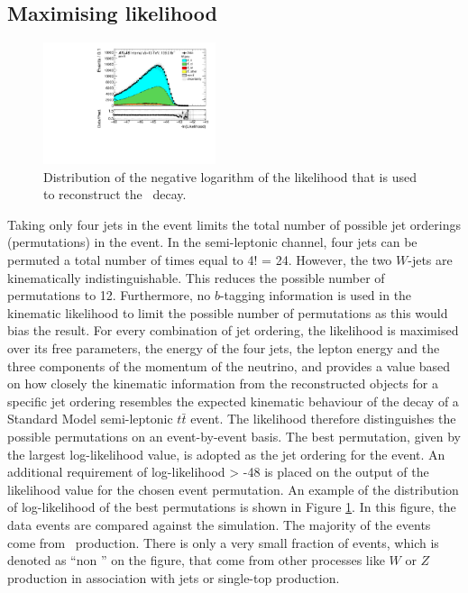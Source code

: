 \documentclass[letterpaper,12pt]{article}
\begin{document}
\subsection{Maximising likelihood}
\label{maximise likelihood}
\begin{figure}[!h]
	\centering
	\includegraphics[width=0.45\textwidth]{prefit/DataMC_h_LLR_all_3bunc.pdf}
	\caption{Distribution of  the negative logarithm of the likelihood that
	is used to reconstruct the \ttbar\ decay.}
	\label{fig:llr}
\end{figure}

Taking only four jets in the event limits the total number of possible 
jet orderings (permutations) in the event. In the semi-leptonic channel, 
four jets can be permuted a total number of times equal to 4! = 24. 
However, the two $W$-jets are kinematically indistinguishable. 
This reduces the possible number of permutations to 12. 
Furthermore, no $b$-tagging information is used 
in the kinematic likelihood to limit the possible number of permutations
as this would bias the result.
For every combination of jet ordering, 
the likelihood is maximised over 
its free parameters, the energy of the four jets, the lepton energy and 
the three components of the momentum of the neutrino, and provides a 
value based on how closely the kinematic information from the reconstructed 
objects for a specific jet ordering resembles the expected kinematic behaviour 
of the decay of a Standard Model semi-leptonic $t\bar{t}$ event. The likelihood 
therefore distinguishes the possible permutations on an event-by-event basis. 
The best permutation, given by the largest log-likelihood value, is adopted 
as the jet ordering for the event. 
An additional requirement of log-likelihood > -48 is 
placed on the output of the likelihood value for the chosen event permutation. 
An example of the distribution of log-likelihood of the best permutations 
is shown in Figure \ref{fig:llr}. 
In this figure, the data events are compared against the simulation.
The majority of the events come from \ttbar\ production. There is only
a very small fraction of events, which is denoted as ``non \ttbar''
on the figure, that come from other processes like $W$ or $Z$ production
in association with jets or single-top production.
\end{document}

